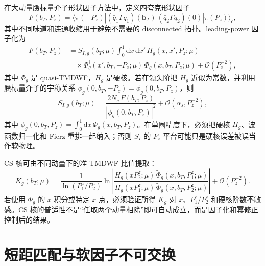 \documentclass[UTF8,12pt,a4paper,twoside,openany]{ctexbook}
\newcommand{\dd}{\mathrm{d}}
\newcommand{\bT}{\boldsymbol b_T}
\begin{document}
在大动量赝标量介子形状因子方法中，定义四夸克形状因子
\begin{equation}
  F(b_T,P_z)
  =\langle \pi(-P_z)|
  (\bar q_1\Gamma q_1)(\bT)\,
  (\bar q_2\Gamma q_2)(0)
  |\pi(P_z)\rangle_c ,
  \label{eq:mesonformfactor}
\end{equation}
其中不同味道和连通收缩用于避免不需要的 disconnected 拓扑。leading-power 因子化为
\begin{equation}
  \begin{aligned}
  F(b_T,P_z)
  &=S_{I,g}(b_T;\mu)
  \int_0^1\dd x\,\dd x'\,
  H_g(x,x',P_z;\mu)\\
  &\quad\times
  \Phi_g^\dagger(x',b_T,-P_z;\mu)\,
  \Phi_g(x,b_T,P_z;\mu)
  +\mathcal O(P_z^{-2}),
  \end{aligned}
  \label{eq:mesonfactorization}
\end{equation}
其中 \(\Phi_g\) 是 quasi-TMDWF，\(H_g\) 是硬核。若在领头阶把 \(H_g\) 近似为常数，并利用赝标量介子的宇称关系 \(\phi_g(0,b_T,-P_z)=\phi_g(0,b_T,P_z)\)，则
\begin{equation}
  S_{I,g}(b_T;\mu)
  =\frac{2N_c\,F(b_T,P_z)}
  {|\phi_g(0,b_T,P_z)|^2}
  +\mathcal O(\alpha_s,P_z^{-2}),
  \label{eq:SIextraction}
\end{equation}
其中 \(\phi_g(0,b_T,P_z)=\int_0^1\dd x\,\Phi_g(x,b_T,P_z)\)。在单圈精度下，必须把硬核 \(H_g\)、波函数归一化和 Fierz 重排一起纳入；否则 \(S_I\) 的 \(P_z\) 平台可能只是硬核误差被误当作软物理\cite{ZhangSoft2020,ChuSoft2023}。

CS 核可由不同动量下的准 TMDWF 比值提取：
\begin{equation}
  K_g(b_T;\mu)
  =\frac{1}{\ln(P_1^z/P_2^z)}
  \ln\left|
  \frac{H_g(xP_2^z;\mu)\,
  \widetilde\Phi_g(x,b_T,P_1^z;\mu)}
  {H_g(xP_1^z;\mu)\,
  \widetilde\Phi_g(x,b_T,P_2^z;\mu)}
  \right|
  +\mathcal O(P_z^{-2}).
  \label{eq:CScore}
\end{equation}
若使用 \(\Phi_g\) 的 \(x\) 积分或特定 \(x\) 点，必须验证所得 \(K_g\) 对 \(x\)、\(P_1^z/P_2^z\) 和硬核阶数不敏感。CS 核的普适性不是“任取两个动量相除”即可自动成立，而是因子化和幂修正控制后的结果。

\section{短距匹配与软因子不可交换}
\end{document}
